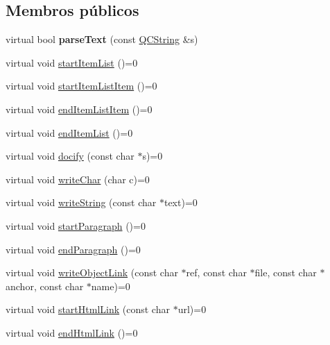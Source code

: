 \subsection*{Membros públicos}
\begin{DoxyCompactItemize}
\item 
\hypertarget{class_base_output_doc_interface_a4a14fbec28aa838ac6e333e0bcea0216}{virtual bool {\bfseries parse\-Text} (const \hyperlink{class_q_c_string}{Q\-C\-String} \&s)}\label{class_base_output_doc_interface_a4a14fbec28aa838ac6e333e0bcea0216}

\item 
virtual void \hyperlink{class_base_output_doc_interface_a432e618b3c8820e00496c6b242947e72}{start\-Item\-List} ()=0
\item 
virtual void \hyperlink{class_base_output_doc_interface_a6cfe1cc2a5fa5cdb1eea280df003903a}{start\-Item\-List\-Item} ()=0
\item 
virtual void \hyperlink{class_base_output_doc_interface_a8161fe76c2c66d47d0eb078be885bec7}{end\-Item\-List\-Item} ()=0
\item 
virtual void \hyperlink{class_base_output_doc_interface_a818d290261244e40e8c70562a7198156}{end\-Item\-List} ()=0
\item 
virtual void \hyperlink{class_base_output_doc_interface_a6f6bec326f718b326fb67adb943ebc27}{docify} (const char $\ast$s)=0
\item 
virtual void \hyperlink{class_base_output_doc_interface_a936e81608db3018f2bce9cd3ee58fdcd}{write\-Char} (char c)=0
\item 
virtual void \hyperlink{class_base_output_doc_interface_a78a005d8c0329ee60cd1994eb4afc58b}{write\-String} (const char $\ast$text)=0
\item 
virtual void \hyperlink{class_base_output_doc_interface_a4b8b270f90567b9201c44a6ad2ad206f}{start\-Paragraph} ()=0
\item 
virtual void \hyperlink{class_base_output_doc_interface_a9a97d4c8fb4e8ac91125f9ff2718d83d}{end\-Paragraph} ()=0
\item 
virtual void \hyperlink{class_base_output_doc_interface_aa551443db6cf9e4f51bc12c9d753f9c3}{write\-Object\-Link} (const char $\ast$ref, const char $\ast$file, const char $\ast$anchor, const char $\ast$name)=0
\item 
virtual void \hyperlink{class_base_output_doc_interface_ae514e80c628faa0b5ee62a50185f2397}{start\-Html\-Link} (const char $\ast$url)=0
\item 
virtual void \hyperlink{class_base_output_doc_interface_a463c695844e8137b388af6e1bbafc19e}{end\-Html\-Link} ()=0

\end{DoxyCompactItemize}
